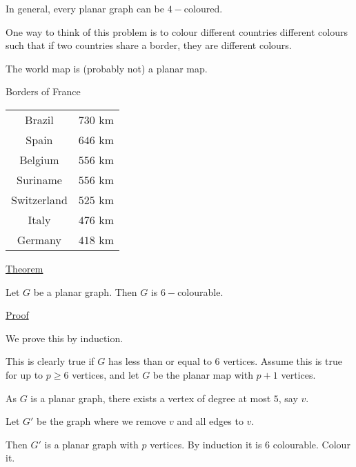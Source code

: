 \documentclass{article}
\begin{document}
In general, every planar graph can be $4-$coloured. 

One way to think of this problem is to colour different countries different colours such that if two countries share a border, they are different colours. 

The world map is (probably not) a planar map. 

Borders of France

\begin{table}[h]
    \begin{tabular}{cc}
        Brazil & $730$ km\\
        Spain & $646$ km\\
        Belgium & $556$ km\\
        Suriname & $556$ km\\
        Switzerland & $525$ km\\
        Italy & $476$ km\\
        Germany & $418$ km\\
    \end{tabular}
\end{table}

\underline{Theorem}

Let $G$ be a planar graph. Then $G$ is $6-$colourable. 

\underline{Proof}

We prove this by induction. 

This is clearly true if $G$ has less than or equal to $6$ vertices. Assume this is true for up to $p \ge 6$ vertices, and let $G$ be the planar map with $p + 1$ vertices. 

As $G$ is a planar graph, there exists a vertex of degree at most $5$, say $v$. 

Let $G'$ be the graph where we remove $v$ and all edges to $v$. 

Then $G'$ is a planar graph with $p$ vertices. By induction it is $6$ colourable. Colour it. 
\end{document}
